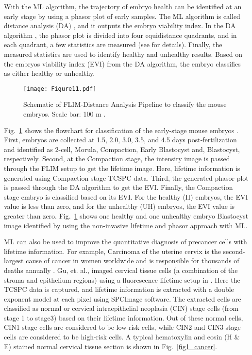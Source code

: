 \documentclass[12pt]{iopart}
\begin{document}
With the ML algorithm, the trajectory of embryo health can be identified at an early stage by using a phasor plot of early samples. The ML algorithm is called distance analysis (DA) \cite{distance_analysis}, and it outputs the embryo viability index. In the DA algorithm \cite{distance_analysis}, the phasor plot is divided into four equidistance quadrants, and in each quadrant, a few statistics are measured (see \cite{distance_analysis} for details). Finally, the measured statistics are used to identify healthy and unhealthy results. Based on the embryos viability index (EVI) from the DA algorithm, the embryo classifies as either healthy or unhealthy. 

\begin{figure}[!t]
\centering
\texttt{[image: Figure11.pdf]}
\caption{Schematic of FLIM-Distance Analysis Pipeline to classify the mouse embryos. Scale bar: 100 m \cite{label}.}\label{fig1_labels1}
\end{figure}

Fig.~\ref{fig1_labels1} shows the flowchart for classification of the early-stage mouse embryos \cite{label}. First, embryos are collected at 1.5, 2.0, 3.0, 3.5, and 4.5 days post-fertilization and identified as 2-cell, Morula, Compaction, Early Blastocyst and, Blastocyst, respectively. Second, at the Compaction stage, the intensity image is passed through the FLIM setup to get the lifetime image. Here, lifetime information is generated using Compaction stage TCSPC data. Third, the generated phasor plot is passed through the DA algorithm to get the EVI. Finally, the Compaction stage embryo is classified based on its EVI. For the healthy (H) embryos, the EVI value is less than zero, and for the unhealthy (UH) embryos, the EVI value is greater than zero. Fig.~\ref{fig1_labels1} shows one healthy and one unhealthy embryo Blastocyst image identified by using the non-invasive lifetime and phasor approach with ML. 

ML can also be used to improve the quantitative diagnosis of precancer cells with lifetime information. For example, Carcinoma of the uterine cervix is the second-largest cause of cancer in women worldwide and is responsible for thousands of deaths annually \cite{cancer_intro}. Gu, et. al., imaged cervical tissue cells (a combination of the stroma and epithelium regions) using a fluorescence lifetime setup in \cite{cancer1}. Here the TCSPC data is captured, and lifetime information is extracted with a double exponent model at each pixel using SPCImage software. The extracted cells are classified as normal or cervical intraepithelial neoplasia (CIN) stage cells (from stage 1 to stage3) based on their lifetime information. Out of these normal cells, CIN1 stage cells are considered to be low-risk cells, while CIN2 and CIN3 stage cells are considered to be high-risk cells. A typical hematoxylin and eosin (H \& E) stained normal cervical tissue section is shown in Fig.~\ref{fig1_cancer}.
\end{document}

